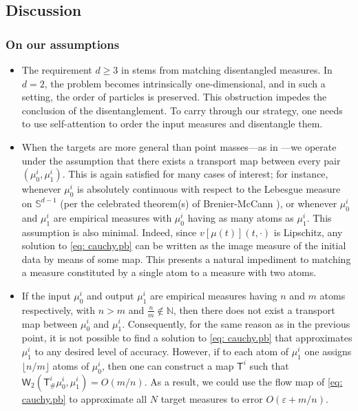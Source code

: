 \documentclass[a4paper,11pt]{article}
\theoremstyle{plain}
\renewcommand{\S}{\mathbb{S}^{d-1}}
\renewcommand{\geq}{\geqslant}
\numberwithin{equation}{section}
\begin{document}
\subsection{Discussion} \label{sec: discussion}

\subsubsection{On our assumptions}  

\begin{itemize}
    \item The requirement $d \geq 3$ in  stems from matching disentangled measures. In $d = 2$, the problem becomes intrinsically one-dimensional, and in such a setting, the order of particles is preserved. This obstruction impedes the conclusion of the disentanglement. To carry through our strategy, one needs to use self-attention to order the input measures and disentangle them.


    \item When the targets are more general than point masses---as in ---we operate under the assumption that there exists a transport map between every pair $(\mu_0^i, \mu_1^i)$. This is again satisfied for many cases of interest; for instance, whenever $\mu_0^i$ is absolutely continuous with respect to the Lebesgue measure on $\S$ (per the celebrated theorem(s) of Brenier-McCann \cite{brenier1991polar, mccann2001polar}), or whenever $\mu_0^i$ and $\mu_1^i$ are empirical measures with $\mu_0^i$ having as many atoms as $\mu_1^i$. This assumption is also minimal. Indeed, since $v[\mu(t)](t,\cdot)$ is Lipschitz, any solution to \eqref{eq: cauchy.pb} can be written as the image measure of the initial data by means of some map. This presents a natural impediment to matching a measure constituted by a single atom to a measure with two atoms.

    \item If the input $\mu_0^i$ and output $\mu_1^i$ are empirical measures having $n$ and $m$ atoms respectively, 
    with $n > m$ and $\frac{n}{m} \notin \mathbb{N}$, then there does not exist a transport map between $\mu_0^i$ and $\mu_1^ i$. 
    Consequently, for the same reason as in the previous point, it is not possible to find a solution to \eqref{eq: cauchy.pb} that approximates $\mu_1^i$ to any desired level of accuracy. However, if to each atom of $\mu_1^i$ one assigns  $\lfloor n/m \rfloor$ atoms of $\mu_0^i$, then one can construct a map $\mathsf{T}^i$ such that $\mathsf{W}_2(\mathsf{T}_\#^i\mu_0^i, \mu_1^i) = O\left(m/n\right)$. As a result, we could use the flow map of  \eqref{eq: cauchy.pb} to approximate all $N$ target measures 
     to error $O(\varepsilon+m/n)$.
\end{itemize} 
\end{document}
